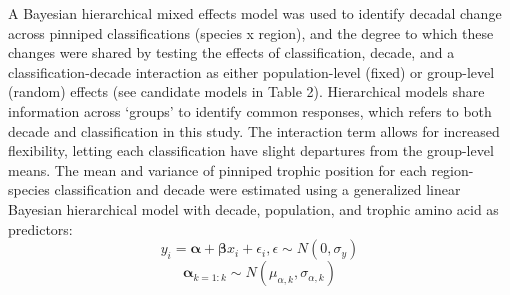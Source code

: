 \documentclass [11pt, proquest] {uwthesis}[2015/03/03]
\begin{document}
A Bayesian hierarchical mixed effects model was used to identify decadal change across pinniped classifications (species x region), and the degree to which these changes were shared by testing the effects of classification, decade, and a classification-decade interaction as either population-level (fixed) or group-level (random) effects (see candidate models in Table 2). Hierarchical models share information across `groups' to identify common responses, which refers to both decade and classification in this study. The interaction term allows for increased flexibility, letting each classification have slight departures from the group-level means. The mean and variance of pinniped trophic position for each region-species classification and decade were estimated using a generalized linear Bayesian hierarchical model with decade, population, and trophic amino acid as predictors:
\begin{equation} 
y_i = \boldsymbol\alpha + \boldsymbol\beta x_i + \epsilon_i, \epsilon \sim N(0,\sigma_y)
  \label{eq:linsex}
\end{equation}
\begin{equation} 
\boldsymbol\alpha_{k=1:k} \sim N(\mu_{\alpha,k},\sigma_{\alpha,k})
  \label{eq:linsex}
\end{equation}
\end{document}
